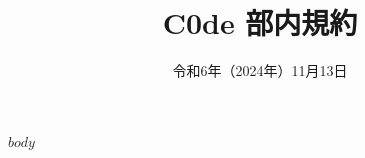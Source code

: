 \documentclass{article}
\title{C0de 部内規約}
\date{令和6年（2024年）11月13日}
\begin{document}
$body$
\end{document}
